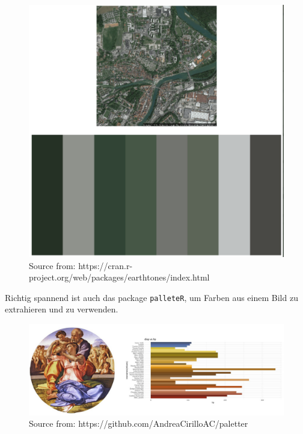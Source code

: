 \documentclass[
]{article}
\begin{document}
\begin{figure}

{\centering \includegraphics[width=8.32in]{images/062} 

}

\caption{Source from: https://cran.r-project.org/web/packages/earthtones/index.html}\label{fig:unnamed-chunk-236}
\end{figure}

Richtig spannend ist auch das package \texttt{palleteR}, um Farben aus einem Bild zu extrahieren und zu verwenden.

\begin{figure}

{\centering \includegraphics[width=23.96in]{images/063} 

}

\caption{Source from: https://github.com/AndreaCirilloAC/paletter}\label{fig:unnamed-chunk-237}
\end{figure}
\end{document}
